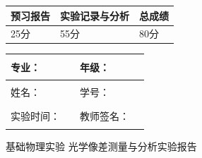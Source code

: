 \documentclass[dvipsnames, svgnames,a4paper,11pt]{article}
\begin{document}
\begin{table}
	\renewcommand\arraystretch{1.7}
	\begin{tabularx}{\textwidth}{
		|X|X
		|X|X|X|X|}
	\hline
	\multicolumn{2}{|c|}{预习报告}&\multicolumn{2}{|c|}{实验记录与分析}&\multicolumn{2}{|c|}{总成绩}\\
	\hline
	25分 & & 55分 & & 80分 & \\
	\hline
	\end{tabularx}
\end{table}

\begin{table}
	\renewcommand\arraystretch{1.7}
	\begin{tabularx}{\textwidth}{|X|X|X|X|}
	\hline
	专业：& \rule{2.5cm}{0.4pt} &年级：& \rule{2.5cm}{0.4pt} \\
	\hline
	姓名：& \rule{2.5cm}{0.4pt}   & 学号： &  \rule{3cm}{0.4pt}\\
	\hline
	实验时间：& \rule{3cm}{0.4pt} & 教师签名：& \rule{3cm}{0.4pt} \\
	\hline
	\end{tabularx}
\end{table}

\begin{center}
	\LARGE 基础物理实验 \quad 光学像差测量与分析实验报告
\end{center}
\end{document}

